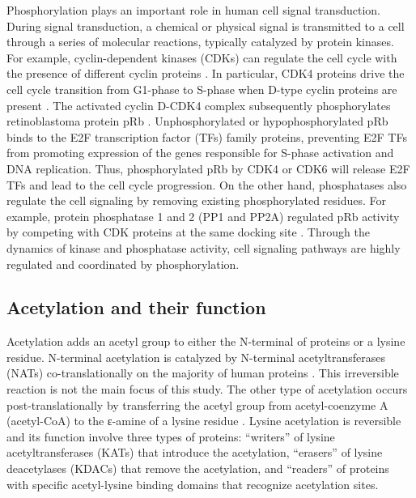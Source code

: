 Phosphorylation plays an important role in human cell signal transduction. During signal transduction, a chemical or physical signal is transmitted to a cell through a series of molecular reactions, typically catalyzed by protein kinases. For example, cyclin-dependent kinases (CDKs) can regulate the cell cycle with the presence of different cyclin proteins \cite{malumbresm_malumbresm:CyclindependentKinases2014}. In particular, CDK4 proteins drive the cell cycle transition from G1-phase to S-phase when D-type cyclin proteins are present \cite{olearyb_turnernc:TreatingCancer2016}. The activated cyclin D-CDK4 complex subsequently phosphorylates retinoblastoma protein pRb \cite{narasimhaam_dowdysf:CyclinActivates2014}. Unphosphorylated or hypophosphorylated pRb binds to the E2F transcription factor (TFs) family proteins, preventing E2F TFs from promoting expression of the genes responsible for S-phase activation and DNA replication. Thus, phosphorylated pRb by CDK4 or CDK6 will release E2F TFs and lead to the cell cycle progression. On the other hand, phosphatases also regulate the cell signaling by removing existing phosphorylated residues. For example, protein phosphatase 1 and 2 (PP1 and PP2A) regulated pRb activity by competing with CDK proteins at the same docking site \cite{wlodarchakn_xingy:PP2AMaster2016}. Through the dynamics of kinase and phosphatase activity, cell signaling pathways are highly regulated and coordinated by phosphorylation.


\subsection{Acetylation and their function}
Acetylation adds an acetyl group to either the N-terminal of proteins or a lysine residue. N-terminal acetylation is catalyzed by N-terminal acetyltransferases (NATs) co-translationally on the majority of human proteins \cite{starheimkk_arnesent:ProteinNterminal2012}. This irreversible reaction is not the main focus of this study. The other type of acetylation occurs post-translationally by transferring the acetyl group from acetyl-coenzyme A (acetyl-CoA) to the ε-amine of a lysine residue \cite{alii_ottm:LysineAcetylation2018}. Lysine acetylation is reversible and its function involve three types of proteins: ``writers'' of lysine acetyltransferases (KATs) that introduce the acetylation, ``erasers'' of lysine deacetylases (KDACs) that remove the acetylation, and ``readers'' of proteins with specific acetyl-lysine binding domains that recognize acetylation sites.

